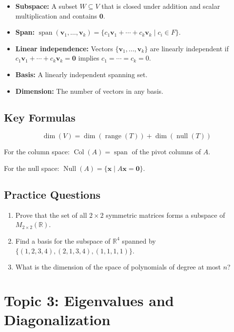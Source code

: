 \documentclass[
    language=english,
    doctype=study-guide,
    institution=none,
]{../../omnilatex}
\begin{document}
\begin{itemize}
    \item \textbf{Subspace:} A subset $W \subseteq V$ that is closed under addition and scalar multiplication and contains $\mathbf{0}$.
    \item \textbf{Span:} $\operatorname{span}(\mathbf{v}_1, \ldots, \mathbf{v}_k) = \{c_1\mathbf{v}_1 + \cdots + c_k\mathbf{v}_k \mid c_i \in F\}$.
    \item \textbf{Linear independence:} Vectors $\{\mathbf{v}_1, \ldots, \mathbf{v}_k\}$ are linearly independent if $c_1\mathbf{v}_1 + \cdots + c_k\mathbf{v}_k = \mathbf{0}$ implies $c_1 = \cdots = c_k = 0$.
    \item \textbf{Basis:} A linearly independent spanning set.
    \item \textbf{Dimension:} The number of vectors in any basis.
\end{itemize}

\subsection{Key Formulas}

\[
\dim(V) = \dim(\operatorname{range}(T)) + \dim(\operatorname{null}(T))
\]

For the column space: $\operatorname{Col}(A) = \operatorname{span}$ of the pivot columns of $A$.

For the null space: $\operatorname{Null}(A) = \{\mathbf{x} \mid A\mathbf{x} = \mathbf{0}\}$.

\subsection{Practice Questions}

\begin{enumerate}
    \item Prove that the set of all $2 \times 2$ symmetric matrices forms a subspace of $M_{2 \times 2}(\mathbb{R})$.
    \item Find a basis for the subspace of $\mathbb{R}^4$ spanned by $\{(1,2,3,4), (2,1,3,4), (1,1,1,1)\}$.
    \item What is the dimension of the space of polynomials of degree at most $n$?
\end{enumerate}

\section{Topic 3: Eigenvalues and Diagonalization}
\end{document}
